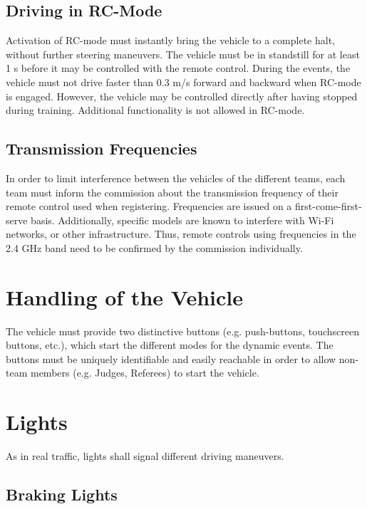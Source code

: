 \documentclass[a4paper]{report}
\begin{document}
\subsection{Driving in RC-Mode}

Activation of RC-mode must instantly bring the vehicle to a complete halt,
without further steering maneuvers. The vehicle must be in standstill for at
least 1 s before it may be controlled with the remote control. During the
events, the vehicle must not drive faster than 0.3 m/s forward and backward
when RC-mode is engaged. However, the vehicle may be controlled directly after
having stopped during training. Additional functionality is not allowed in
RC-mode.

\subsection{Transmission Frequencies}

In order to limit interference between the vehicles of the different teams,
each team must inform the commission about the transmission frequency of their
remote control used when registering. Frequencies are issued on a
first-come-first-serve basis. Additionally, specific models are known to
interfere with Wi-Fi networks, or other infrastructure. Thus, remote controls
using frequencies in the 2.4 GHz band need to be confirmed by the commission
individually.

\section{Handling of the Vehicle}

The vehicle must provide two distinctive buttons (e.g. push-buttons,
touchscreen buttons, etc.), which start the different modes for the dynamic
events. The buttons must be uniquely identifiable and easily reachable in order
to allow non-team members (e.g. Judges, Referees) to start the vehicle.

\section{Lights}

As in real traffic, lights shall signal different driving maneuvers.

\subsection{Braking Lights}
\end{document}
